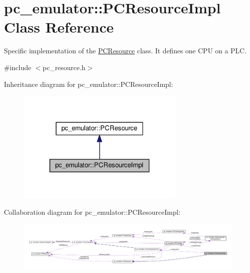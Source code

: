 \hypertarget{classpc__emulator_1_1PCResourceImpl}{}\section{pc\+\_\+emulator\+:\+:P\+C\+Resource\+Impl Class Reference}
\label{classpc__emulator_1_1PCResourceImpl}


Specific implementation of the \hyperlink{classpc__emulator_1_1PCResource}{P\+C\+Resource} class. It defines one C\+PU on a P\+LC.  




{\ttfamily \#include $<$pc\+\_\+resource.\+h$>$}



Inheritance diagram for pc\+\_\+emulator\+:\+:P\+C\+Resource\+Impl\+:
\nopagebreak
\begin{figure}[H]
\begin{center}
\leavevmode
\includegraphics[width=231pt]{classpc__emulator_1_1PCResourceImpl__inherit__graph}
\end{center}
\end{figure}


Collaboration diagram for pc\+\_\+emulator\+:\+:P\+C\+Resource\+Impl\+:
\nopagebreak
\begin{figure}[H]
\begin{center}
\leavevmode
\includegraphics[width=350pt]{classpc__emulator_1_1PCResourceImpl__coll__graph}
\end{center}
\end{figure}
